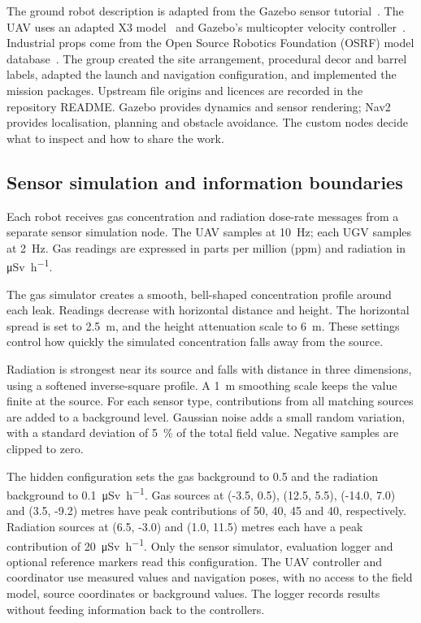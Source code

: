 \documentclass[conference]{IEEEtran}
\begin{document}
The ground robot description is adapted from the Gazebo sensor tutorial~\cite{gazebo}. The UAV uses an adapted X3 model~\cite{x3} and Gazebo's multicopter velocity controller~\cite{gzsim}. Industrial props come from the Open Source Robotics Foundation (OSRF) model database~\cite{models}. The group created the site arrangement, procedural decor and barrel labels, adapted the launch and navigation configuration, and implemented the mission packages. Upstream file origins and licences are recorded in the repository README. Gazebo provides dynamics and sensor rendering; Nav2 provides localisation, planning and obstacle avoidance. The custom nodes decide what to inspect and how to share the work.

\subsection{Sensor simulation and information boundaries}
Each robot receives gas concentration and radiation dose-rate messages from a separate sensor simulation node. The UAV samples at \SI{10}{\hertz}; each UGV samples at \SI{2}{\hertz}. Gas readings are expressed in parts per million (ppm) and radiation in \si{\micro\sievert\per\hour}.

The gas simulator creates a smooth, bell-shaped concentration profile around each leak. Readings decrease with horizontal distance and height. The horizontal spread is set to \SI{2.5}{\metre}, and the height attenuation scale to \SI{6}{\metre}. These settings control how quickly the simulated concentration falls away from the source.

Radiation is strongest near its source and falls with distance in three dimensions, using a softened inverse-square profile. A \SI{1}{\metre} smoothing scale keeps the value finite at the source. For each sensor type, contributions from all matching sources are added to a background level. Gaussian noise adds a small random variation, with a standard deviation of \SI{5}{\percent} of the total field value. Negative samples are clipped to zero.

The hidden configuration sets the gas background to \SI{0.5}{\ppm} and the radiation background to \SI{0.1}{\micro\sievert\per\hour}. Gas sources at (-3.5, 0.5), (12.5, 5.5), (-14.0, 7.0) and (3.5, -9.2) metres have peak contributions of 50, 40, 45 and \SI{40}{\ppm}, respectively. Radiation sources at (6.5, -3.0) and (1.0, 11.5) metres each have a peak contribution of \SI{20}{\micro\sievert\per\hour}. Only the sensor simulator, evaluation logger and optional reference markers read this configuration. The UAV controller and coordinator use measured values and navigation poses, with no access to the field model, source coordinates or background values. The logger records results without feeding information back to the controllers.
\end{document}
